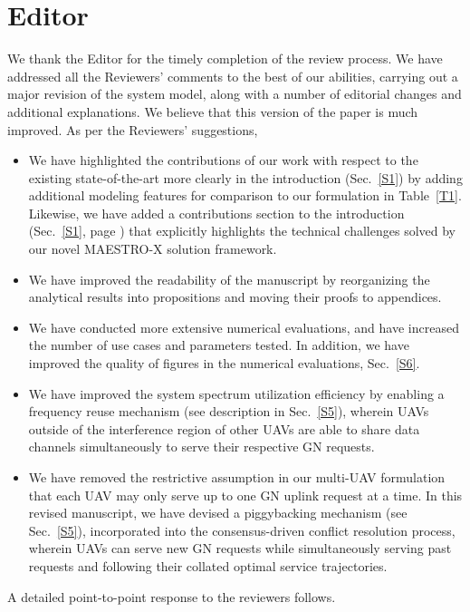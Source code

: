 \documentclass[12pt, draftcls, onecolumn]{IEEEtran}
\theoremstyle{plain}
\theoremstyle{definition}
\theoremstyle{remark}
\begin{document}
\section*{Editor}
We thank the Editor for the timely completion of the review process. We have addressed all the Reviewers' comments to the best of our abilities, carrying out a major revision of the system model, along with a number of editorial changes and additional explanations. We believe that this version of the paper is much improved. As per the Reviewers' suggestions,
\begin{itemize}[leftmargin=*]
    \item We have highlighted the contributions of our work with respect to the existing state-of-the-art more clearly in the introduction (Sec.~\ref{S1}) by adding additional modeling features for comparison to our formulation in Table~\ref{T1}. Likewise, we have added a contributions section to the introduction (Sec.~\ref{S1}, page \pageref{contrib_subs}) that explicitly highlights the technical challenges solved by our novel MAESTRO-X solution framework.
    \item We have improved the readability of the manuscript by reorganizing the analytical results into propositions and moving their proofs to appendices.
    \item We have conducted more extensive numerical evaluations, and have increased the number of use cases and parameters tested. In addition, we have improved the quality of figures in the numerical evaluations, Sec.~\ref{S6}.
    \item We have improved the system spectrum utilization efficiency by enabling a frequency reuse mechanism (see description in Sec.~\ref{S5}), wherein UAVs outside of the interference region of other UAVs are able to share data channels simultaneously to serve their respective GN requests.
    \item We have removed the restrictive assumption in our multi-UAV formulation that each UAV may only serve up to one GN uplink request at a time. In this revised manuscript, we have devised a piggybacking mechanism (see Sec.~\ref{S5}), incorporated into the consensus-driven conflict resolution process, wherein UAVs can serve new GN requests while simultaneously serving past requests and following their collated optimal service trajectories.
\end{itemize}
A detailed \mbox{point-to-point} response to the reviewers follows.
\clearpage
\end{document}
